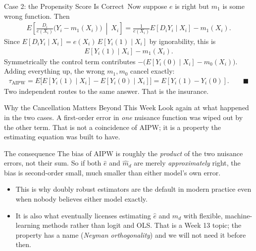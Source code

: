 \documentclass[aspectratio=169,11pt,xcolor=dvipsnames]{beamer}
\newcommand{\E}{E}
\newcommand{\adv}{\,\raisebox{0.6pt}{\textcolor{accent}{$\bigstar$}}}
\begin{document}
\begin{frame}{Case 2: the Propensity Score Is Correct\adv}
Now suppose $e$ is right but $m_1$ is some wrong function. Then
\begin{align*}
  \E\!\left[\frac{D_i}{e(X_i)}\big(Y_i - m_1(X_i)\big)\ \middle|\ X_i\right]
  = \frac{1}{e(X_i)}\E[D_iY_i\mid X_i] - m_1(X_i) .
\end{align*}
Since $\E[D_iY_i\mid X_i] = e(X_i)\,\E[Y_i(1)\mid X_i]$ by ignorability, this is
\begin{align*}
  \E[Y_i(1)\mid X_i] - m_1(X_i) .
\end{align*}
\pause
Symmetrically the control term contributes
$-\big(\E[Y_i(0)\mid X_i] - m_0(X_i)\big)$. Adding everything up, the wrong
$m_1, m_0$ cancel exactly:
\begin{align*}
  \tau_{\text{AIPW}} = \E\Big[\E[Y_i(1)\mid X_i] - \E[Y_i(0)\mid X_i]\Big]
         = \E[Y_i(1)-Y_i(0)] . \qquad\blacksquare
\end{align*}
\vskip2pt
Two independent routes to the same answer. That is the insurance.
\end{frame}

\begin{frame}{Why the Cancellation Matters Beyond This Week}
Look again at what happened in the two cases. A first-order error in \emph{one}
nuisance function was wiped out by the other term. That is not a coincidence of
AIPW; it is a property the estimating equation was built to have.
\vskip4pt
\begin{block}{The consequence}
The bias of AIPW is roughly the \emph{product} of the two nuisance errors, not
their sum. So if both $\hat e$ and $\hat m_d$ are merely \emph{approximately}
right, the bias is second-order small, much smaller than either model's own
error.
\end{block}
\vskip4pt
\begin{itemize}\itemsep3pt
  \item This is why doubly robust estimators are the default in modern practice
        even when nobody believes either model exactly.
  \item It is also what eventually licenses estimating $\hat e$ and $\hat m_d$
        with flexible, machine-learning methods rather than logit and OLS.
        \alert{That is a Week 13 topic}; the property has a name (\emph{Neyman
        orthogonality}) and we will not need it before then.
\end{itemize}
\end{frame}
\end{document}
